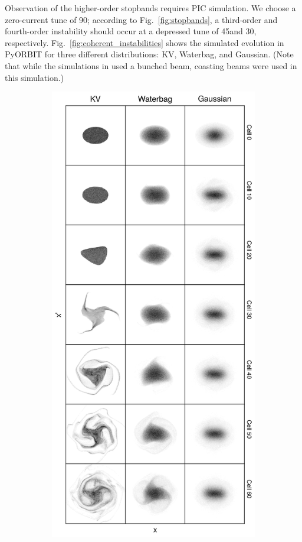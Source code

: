 Observation of the higher-order stopbands requires PIC simulation. We choose a zero-current tune of 90\degree; according to Fig.~\ref{fig:stopbands}, a third-order and fourth-order instability should occur at a depressed tune of 45\degree and 30\degree, respectively. Fig.~\ref{fig:coherent_instabilities} shows the simulated evolution in PyORBIT for three different distributions: KV, Waterbag, and Gaussian. (Note that while the simulations in \cite{Hofmann2017Book} used a bunched beam, coasting beams were used in this simulation.)
%
\begin{figure}[!p]
    \begin{subfigure}[b]{0.45\textwidth}
        \includegraphics[width=\textwidth]{Images/chapter1/coherent_instability_fourth_order.png}

\end{subfigure}
\end{figure}
